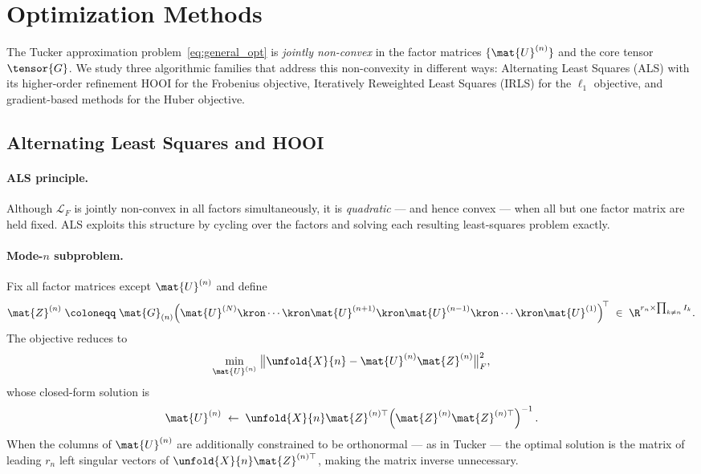 
\section{Optimization Methods}
\label{sec:optimization}

The Tucker approximation problem~\eqref{eq:general_opt} is
\emph{jointly non-convex} in the factor matrices
$\{\mat{U}^{(n)}\}$ and the core tensor $\tensor{G}$.
We study three algorithmic families that address this non-convexity in
different ways: Alternating Least Squares (ALS) with its higher-order
refinement HOOI for the Frobenius objective, Iteratively Reweighted Least
Squares (IRLS) for the $\ell_1$ objective, and gradient-based methods
for the Huber objective.

\subsection{Alternating Least Squares and HOOI}
\label{subsec:als}

\paragraph{ALS principle.}
Although $\mathcal{L}_F$ is jointly non-convex in all factors simultaneously,
it is \emph{quadratic} --- and hence convex --- when all but one factor
matrix are held fixed.
ALS exploits this structure by cycling over the factors and solving each
resulting least-squares problem exactly.

\paragraph{Mode-$n$ subproblem.}
Fix all factor matrices except $\mat{U}^{(n)}$ and define
\begin{equation}
  \mat{Z}^{(n)}
  \;\coloneqq\;
  \mat{G}_{(n)}
  \!\left(
    \mat{U}^{(N)} \kron \cdots \kron \mat{U}^{(n+1)}
    \kron \mat{U}^{(n-1)} \kron \cdots \kron \mat{U}^{(1)}
  \right)^{\!\top}
  \;\in\; \R^{r_n \times \prod_{k\neq n} I_k}.
  \label{eq:Z_factor}
\end{equation}
The objective reduces to
\begin{equation}
  \min_{\mat{U}^{(n)}} \;
  \bigl\|\unfold{X}{n} - \mat{U}^{(n)} \mat{Z}^{(n)}\bigr\|_F^2,
  \label{eq:als_subproblem}
\end{equation}
whose closed-form solution is
\begin{equation}
  \mat{U}^{(n)}
  \;\leftarrow\;
  \unfold{X}{n} \mat{Z}^{(n)\top}
  \!\left(\mat{Z}^{(n)} \mat{Z}^{(n)\top}\right)^{-1}.
  \label{eq:als_update}
\end{equation}
When the columns of $\mat{U}^{(n)}$ are additionally constrained to be
orthonormal --- as in Tucker --- the optimal solution is the matrix of
leading $r_n$ left singular vectors of $\unfold{X}{n} \mat{Z}^{(n)\top}$,
making the matrix inverse unnecessary.

